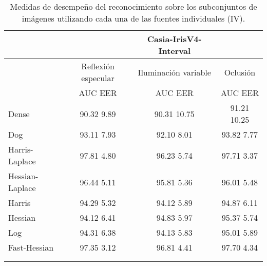 \begin{table}[h]
\begin{center}
\begin{tabular}{@{}lccc@{}}
\toprule
&& Casia-IrisV4-Interval & \\ \hline
&Reflexión especular		&  	Iluminación variable		& Oclusión \\ \hline
&AUC  \phantom{aa} EER  &  	AUC  \phantom{aa} EER 	& AUC  \phantom{aa} EER  \\ \hline
Dense& 90.32 \phantom{aa} 9.89   &  	90.31 \phantom{aa} 10.75  & 91.21 \phantom{aa} 10.25  \\
Dog& 93.11 \phantom{aa} 7.93   &  	92.10 \phantom{aa} 8.01  & 93.82 \phantom{aa} 7.77  \\
Harris-Laplace& 97.81 \phantom{aa} 4.80   &  	96.23 \phantom{aa} 5.74  & 97.71 \phantom{aa} 3.37  \\
Hessian-Laplace& 96.44 \phantom{aa} 5.11   &  95.81 \phantom{aa} 5.36 & 96.01 \phantom{aa} 5.48  \\
Harris& 94.29  \phantom{aa}5.32  &  	94.12 \phantom{aa} 5.89  & 94.87  \phantom{aa}6.11  \\
Hessian& 94.12 \phantom{aa} 6.41   &  94.83 \phantom{aa} 5.97  & 95.37 \phantom{aa} 5.74  \\
Log& 94.31 \phantom{aa} 6.38  &  94.13  \phantom{aa}5.83 & 95.01 \phantom{aa} 5.89   \\ 
Fast-Hessian& 97.35 \phantom{aa} 3.12   &  	96.81 \phantom{aa} 4.41  & 97.70 \phantom{aa} 4.34  \\  \\  \\

\end{tabular}
\end{center}
\caption{Medidas de desempeño del reconocimiento sobre los subconjuntos de imágenes utilizando cada una de las fuentes individuales (IV).}
\label{my_tabla}
\end{table}


